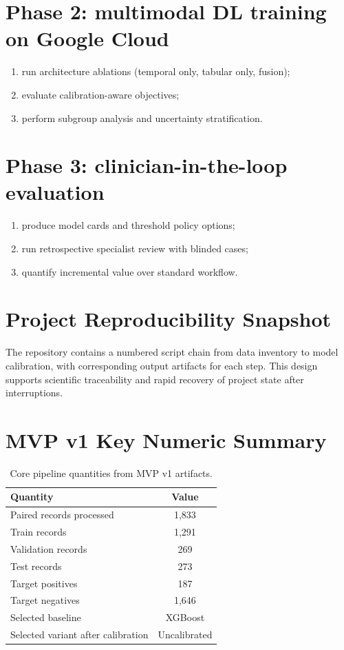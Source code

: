 \documentclass[10pt,a4paper,twocolumn]{article}
\newcommand{\chapter}[1]{\section{#1}}
\begin{document}
\section{Phase 2: multimodal DL training on Google Cloud}
\begin{enumerate}[leftmargin=1.2cm]
    \item run architecture ablations (temporal only, tabular only, fusion);
    \item evaluate calibration-aware objectives;
    \item perform subgroup analysis and uncertainty stratification.
\end{enumerate}

\section{Phase 3: clinician-in-the-loop evaluation}
\begin{enumerate}[leftmargin=1.2cm]
    \item produce model cards and threshold policy options;
    \item run retrospective specialist review with blinded cases;
    \item quantify incremental value over standard workflow.
\end{enumerate}

\clearpage
\appendix

\chapter{Project Reproducibility Snapshot}
The repository contains a numbered script chain from data inventory to model calibration, with corresponding output artifacts for each step. This design supports scientific traceability and rapid recovery of project state after interruptions.

\chapter{MVP v1 Key Numeric Summary}
\begin{table}[H]
\centering
\caption{Core pipeline quantities from MVP v1 artifacts.}
\begin{tabular}{lc}
\toprule
Quantity & Value \\
\midrule
Paired records processed & 1,833 \\
Train records & 1,291 \\
Validation records & 269 \\
Test records & 273 \\
Target positives & 187 \\
Target negatives & 1,646 \\
Selected baseline & XGBoost \\
Selected variant after calibration & Uncalibrated \\
\bottomrule
\end{tabular}
\end{table}
\end{document}
